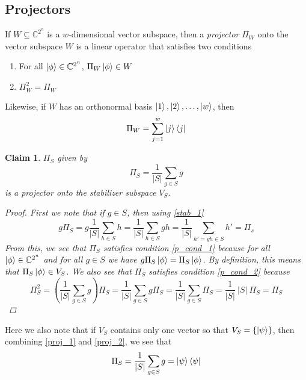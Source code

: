 \message{ !name(report_1.tex)}\documentclass[11pt]{article}
\newtheorem{claim}[thm]{Claim}
\theoremstyle{definition}
\theoremstyle{plain}
\begin{document}
\subsection{Projectors}
If $W \subseteq \mathbb{C}^{2^n}$ is a $w$-dimensional vector subspace, then a \emph{projector} $\Pi_W$ onto the vector subspace $W$ is a linear operator that satisfies two conditions
\begin{enumerate}[label = (\arabic*)]
\item\label{p_cond_1}
  For all $\ket{\phi} \in \mathbb{C}^{2^n}$, $\Pi_W \ket{\phi} \in W$ 
\item\label{p_cond_2} $\Pi_W^2 = \Pi_W$ 
\end{enumerate} 
Likewise, if $W$ has an orthonormal basis $\ket{1}, \ket{2}, \ldots, \ket{w}$, then
\begin{equation}\label{proj_1}
  \Pi_W = \sum\limits_{j=1}^w \ket{j}\bra{j}
\end{equation}

\begin{claim}
$\Pi_S$ given by 
\begin{equation}\label{proj_2}
  \Pi_S = \frac{1}{|S|} \sum\limits_{g \in S} g 
\end{equation}
is a projector onto the stabilizer subspace $V_S$. 
\begin{proof} First we note that if $g \in S$, then using {\ref{stab_1}}
\begin{equation}
  g \Pi_S = g \frac{1}{|S|} \sum\limits_{h \in S} h
  = \frac{1}{|S|} \sum\limits_{h \in S} gh
  = \frac{1}{|S|} \sum\limits_{h' = gh \in S} h'
  = \Pi_s
\end{equation}
From this, we see that $\Pi_S$ satisfies condition {\ref{p_cond_1}} because for all $\ket{\phi} \in \mathbb{C}^{2^n}$ and for all $g \in S$ we have $g \Pi_S \ket{\phi} = \Pi_S \ket{\phi}$. By definition, this means that $\Pi_S \ket{\phi} \in V_S$. We also see that $\Pi_S$ satisfies condition {\ref{p_cond_2}} because
\begin{equation}
  \Pi_S^2 = \left( \frac{1}{|S|} \sum\limits_{g \in S} g \right) \Pi_S 
  = \frac{1}{|S|} \sum\limits_{g \in S} g \Pi_S
  = \frac{1}{|S|} \sum\limits_{g \in S} \Pi_S
  = \frac{1}{|S|} \ |S| \ \Pi_S = \Pi_S 
\end{equation}
\end{proof}
\end{claim}

Here we also note that if $V_S$ contains only one vector so that $V_S = \{ \ket{\psi} \}$, then combining {\ref{proj_1}} and {\ref{proj_2}}, we see that
\begin{equation}\label{proj_3}
    \Pi_S = \frac{1}{|S|} \sum\limits_{g \in S} g = \ket{\psi} \bra{\psi} 
\end{equation}
\end{document}
